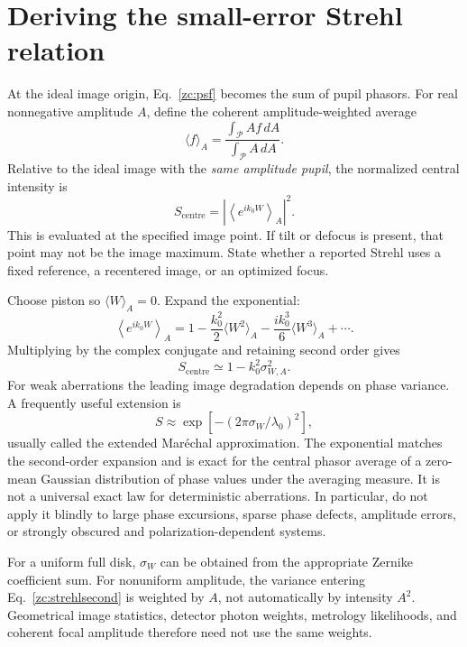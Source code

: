 \section{Deriving the small-error Strehl relation}
At the ideal image origin, Eq.~\eqref{zc:psf} becomes the sum of
pupil phasors. For real nonnegative amplitude $A$, define the coherent
amplitude-weighted average
\begin{equation}
 \langle f\rangle_{A}=
          \frac{\int_{\mathcal P}A f\,dA}{\int_{\mathcal P}A\,dA}.
\end{equation}
Relative to the ideal image with the \emph{same amplitude pupil},
the normalized central intensity is
\begin{equation}
 S_{\mathrm{centre}}=\left|\left\langle
                        e^{ik_0W}\right\rangle_A\right|^2.
 \label{zc:exactcentralstrehl}
\end{equation}
This is evaluated at the specified image point. If tilt or defocus is
present, that point may not be the image maximum. State whether a
reported Strehl uses a fixed reference, a recentered image, or an
optimized focus.

Choose piston so $\langle W\rangle_A=0$. Expand the exponential:
\begin{equation}
 \left\langle e^{ik_0W}\right\rangle_A
       =1-\frac{k_0^2}{2}\langle W^2\rangle_A
           -\frac{ik_0^3}{6}\langle W^3\rangle_A+\cdots.
\end{equation}
Multiplying by the complex conjugate and retaining second order gives
\begin{equation}
 \boxed{S_{\mathrm{centre}}\simeq1-k_0^2\sigma_{W,A}^2.}
 \label{zc:strehlsecond}
\end{equation}
For weak aberrations the leading image degradation depends on phase
variance. A frequently useful extension is
\begin{equation}
 S\approx\exp[-(2\pi\sigma_W/\lambda_0)^2],
 \label{zc:marechal}
\end{equation}
usually called the extended Mar\'echal approximation. The exponential
matches the second-order expansion and is exact for the central
phasor average of a zero-mean Gaussian distribution of phase values
under the averaging measure. It is not a universal exact law for
deterministic aberrations. In particular, do not apply it blindly to
large phase excursions, sparse phase defects, amplitude errors, or
strongly obscured and polarization-dependent systems.

For a uniform full disk, $\sigma_W$ can be obtained from the
appropriate Zernike coefficient sum. For nonuniform amplitude, the
variance entering Eq.~\eqref{zc:strehlsecond} is weighted by $A$,
not automatically by intensity $A^2$. Geometrical image statistics,
detector photon weights, metrology likelihoods, and coherent focal
amplitude therefore need not use the same weights.

